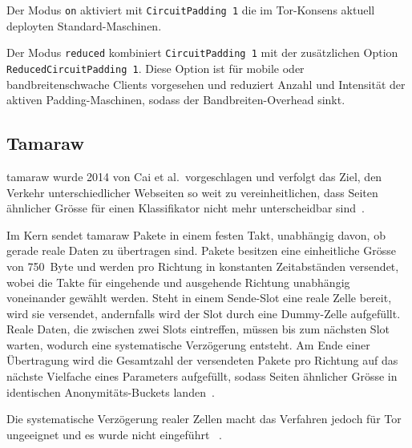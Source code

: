 Der Modus \texttt{on} aktiviert mit \texttt{CircuitPadding 1} die im Tor-Konsens aktuell deployten Standard-Maschinen.

Der Modus \texttt{reduced} kombiniert \texttt{CircuitPadding 1} mit der zusätzlichen Option \texttt{ReducedCircuitPadding 1}.
Diese Option ist für mobile oder bandbreitenschwache Clients vorgesehen und reduziert Anzahl und Intensität der aktiven Padding-Maschinen, sodass der Bandbreiten-Overhead sinkt.


\subsection{Tamaraw}
\label{sec:wf_defenses_tamaraw}

\gls{tamaraw} wurde 2014 von Cai et al.\ vorgeschlagen und verfolgt das Ziel, den Verkehr unterschiedlicher Webseiten so weit zu vereinheitlichen, dass Seiten ähnlicher Grösse für einen Klassifikator nicht mehr unterscheidbar sind~\cite{cai2014systematic}.

Im Kern sendet \gls{tamaraw} Pakete in einem festen Takt, unabhängig davon, ob gerade reale Daten zu übertragen sind.
Pakete besitzen eine einheitliche Grösse von 750~Byte und werden pro Richtung in konstanten Zeitabständen versendet, wobei die Takte für eingehende und ausgehende Richtung unabhängig voneinander gewählt werden.
Steht in einem Sende-Slot eine reale Zelle bereit, wird sie versendet, andernfalls wird der Slot durch eine Dummy-Zelle aufgefüllt.
Reale Daten, die zwischen zwei Slots eintreffen, müssen bis zum nächsten Slot warten, wodurch eine systematische Verzögerung entsteht.
Am Ende einer Übertragung wird die Gesamtzahl der versendeten Pakete pro Richtung auf das nächste Vielfache eines Parameters aufgefüllt, sodass Seiten ähnlicher Grösse in identischen Anonymitäts-Buckets landen~\cite{cai2014systematic}.


Die systematische Verzögerung realer Zellen macht das Verfahren jedoch für Tor ungeeignet und es wurde nicht eingeführt ~\cite{kadianakis2021tor}.



